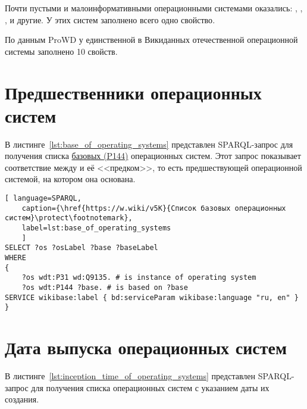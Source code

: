 Почти пустыми и малоинформативными операционными системами оказались: 
, , ,  и другие. 
У этих систем заполнено всего одно свойство\autocite{prowd_os_link}.

По данным ProWD у единственной в Викиданных отечественной операционной системы  заполнено 10 свойств\autocite{prowd_os_link_ru}.


\section{Предшественники операционных систем}

В листинге~\ref{lst:base_of_operating_systems} представлен SPARQL-запрос для получения списка \href{https://www.wikidata.org/wiki/Property_talk:P144}{базовых (P144)} операционных систем. Этот запрос показывает соответствие между  и её <<предком>>, то есть предшествующей операционной системой, на котором она основана.


\begin{lstlisting}[ language=SPARQL, 
	caption={\href{https://w.wiki/v5K}{Список базовых операционных систем}\protect\footnotemark},
	label=lst:base_of_operating_systems
	]
SELECT ?os ?osLabel ?base ?baseLabel
WHERE
{
	?os wdt:P31 wd:Q9135. # is instance of operating system
	?os wdt:P144 ?base. # is based on ?base
SERVICE wikibase:label { bd:serviceParam wikibase:language "ru, en" }
}
\end{lstlisting}

\section{Дата выпуска операционных систем}

В листинге~\ref{lst:inception_time_of_operating_systems} представлен SPARQL-запрос 
для получения списка операционных систем с указанием даты их создания.

